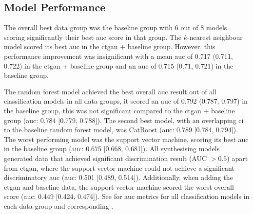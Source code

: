 \documentclass[12pt, a4paper]{article}
\begin{document}
\subsection{Model Performance}
The overall best data group was the baseline group with 6 out of 8 models scoring significantly their best \acrshort{auc} score in that group. The $k$-nearest neighbour model scored its best \acrshort{auc} in the \acrshort{ctgan} + baseline group. However, this performance improvement was insignificant with a mean \acrshort{auc} of 0.717 (0.711, 0.722) in the \acrshort{ctgan} + baseline group and an \acrshort{auc} of 0.715 (0.71, 0.721) in the baseline group.

The random forest model achieved the best overall \acrshort{auc} result out of all classification models in all data groups, it scored an \acrshort{auc} of 0.792 (0.787, 0.797) in the baseline group, this was not significant compared to the \acrshort{ctgan} + baseline group (\acrshort{auc}: 0.784 [0.779, 0.788]). The second best model, with an overlapping \acrshort{ci} to the baseline random forest model, was CatBoost (\acrshort{auc}: 0.789 [0.784, 0.794]). The worst performing model was the support vector machine, scoring its best \acrshort{auc} in the baseline group (\acrshort{auc}: 0.675 [0.668, 0.681]). All synthesising models generated data that achieved significant discrimination result (AUC $> 0.5$) apart from \acrshort{ctgan}, where the support vector machine could not achieve a significant discriminatory \acrshort{auc} (\acrshort{auc}: 0.501 [0.489, 0.514]). Additionally, when adding the \acrshort{ctgan} and baseline data, the support vector machine scored the worst overall score (\acrshort{auc}: 0.449 [0.424, 0.474]). See  for \acrshort{auc} metrics for all classification models in each data group and corresponding .
\end{document}
